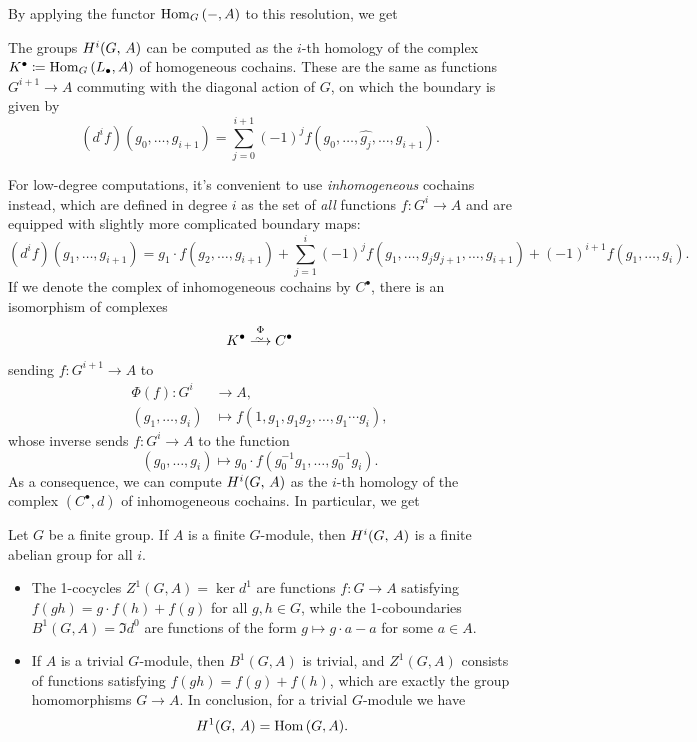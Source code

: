 \documentclass[a4paper, oneside]{memoir}
\begin{document}
By applying the functor $\operatorname{Hom}_G{(-,A)}$ to this resolution, we get
\begin{theorem}
    The groups $H^{i}( G, \, A )$ can be computed as the $i$-th homology of the complex $K^\bullet\coloneqq \operatorname{Hom}_G{(L_\bullet,A)}$ of \textnormal{homogeneous} cochains. These are the same as functions $G^{i+1}\to A$ commuting with the diagonal action of $G$, on which the boundary is given by
    \[
        (d^i f)(g_0,\dots , g_{i+1})=\sum_{j=0}^{i+1} (-1)^j f(g_0,\dots , \hat{g_j},\dots , g_{i+1}).
    \]
\end{theorem}

For low-degree computations, it's convenient to use \textit{inhomogeneous} cochains instead, which are defined in degree $i$ as the set of \textit{all} functions $f: G^i\to A$ and are equipped with slightly more complicated boundary maps:
\[
    (d^i f)(g_1,\dots , g_{i+1})=g_1\cdot f(g_2,\dots , g_{i+1})+\sum_{j=1}^{i} (-1)^j f(g_1,\dots , g_j g_{j+1},\dots , g_{i+1})+(-1)^{i+1} f(g_1,\dots , g_i).
\]
If we denote the complex of inhomogeneous cochains by $C^\bullet$, there is an isomorphism of complexes
\[
    K^\bullet\overset{\Phi}{\Iso} C^\bullet
\]
sending $f: G^{i+1}\to A$ to
\begin{align*}
    \Phi(f): G^i      & \to A,                                            \\
    (g_1,\dots , g_i) & \mapsto f(1,g_1, g_1 g_2, \dots , g_1\cdots g_i),
\end{align*}
whose inverse sends $f: G^i\to A$ to the function
\[
    (g_0,\dots , g_i)\mapsto g_0\cdot f(g_0^{-1}g_1,\dots , g_0^{-1}g_i).
\]
As a consequence, we can compute $H^{i}( G, \, A )$ as the $i$-th homology of the complex $(C^\bullet, d)$ of inhomogeneous cochains. In particular, we get

\begin{corollary}
    Let $G$ be a finite group. If $A$ is a finite $G$-module, then $H^{i}( G, \, A )$ is a finite abelian group for all $i$.
\end{corollary}
\newpage
\begin{example}
    \noindent
    \begin{itemize}
        \item The 1-cocycles $Z^1(G,A)=\ker{d^1}$ are functions $f: G\to A$ satisfying $f(gh)=g\cdot f(h)+f(g)$ for all $g,h\in G$, while the 1-coboundaries $B^1(G,A)=\Im{d^0}$ are functions of the form $g\mapsto g\cdot a-a$ for some $a\in A$.
        \item\label{ex:TrivialModH1} If $A$ is a trivial $G$-module, then $B^1(G,A)$ is trivial, and $Z^1(G,A)$ consists of functions satisfying $f(gh)=f(g)+f(h)$, which are exactly the group homomorphisms $G\to A$. In conclusion, for a trivial $G$-module we have \[H^{1}( G, \, A )=\operatorname{Hom}{(G,A)}.\]
    \end{itemize}
\end{example}
\end{document}
